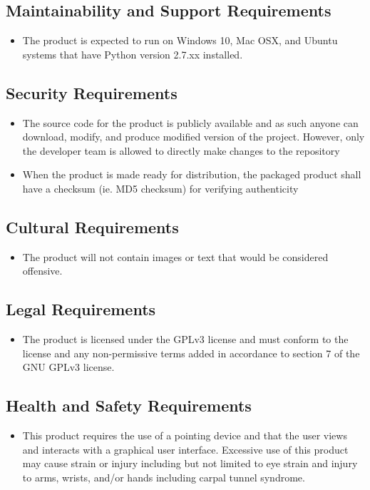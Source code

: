 \documentclass[12pt, titlepage]{article}
\newcommand {\PYVER}{2.7.xx }
\begin{document}
		\subsection{Maintainability and Support Requirements}
		\begin{itemize}
			\itemsep0em
			\item The product is expected to run on Windows 10, Mac OSX, and 
			Ubuntu systems that have Python version \PYVER installed.
		\end{itemize}
		\subsection{Security Requirements}
		\begin{itemize}
			\itemsep0em
			\item The source code for the product is publicly available and as such
			anyone can download, modify, and produce modified version of the project.
			However, only the developer team is allowed to directly make changes to the 
			repository
			\item When the product is made ready for distribution, the packaged product
			shall have a checksum (ie. MD5 checksum) for verifying authenticity
		\end{itemize}
		\subsection{Cultural Requirements}
		\begin{itemize}
			\itemsep0em
			\item The product will not contain images or text that would be 
			considered offensive.
		\end{itemize}
		\subsection{Legal Requirements}
		\begin{itemize}
			\itemsep0em
			\item The product is licensed under the  GPLv3 license and must 
			conform to the license and any non-permissive terms added in 
			accordance to section 7 of the GNU GPLv3 license.
		\end{itemize}
		\subsection{Health and Safety Requirements}
		\begin{itemize}
			\itemsep0em
			\item This product requires the use of a pointing device and that the user
			views and interacts with a graphical user interface. Excessive use of this
			product may cause strain or injury including but not limited to eye strain
			and injury to arms, wrists, and/or hands including carpal tunnel syndrome.
		\end{itemize}
		
\end{document}
